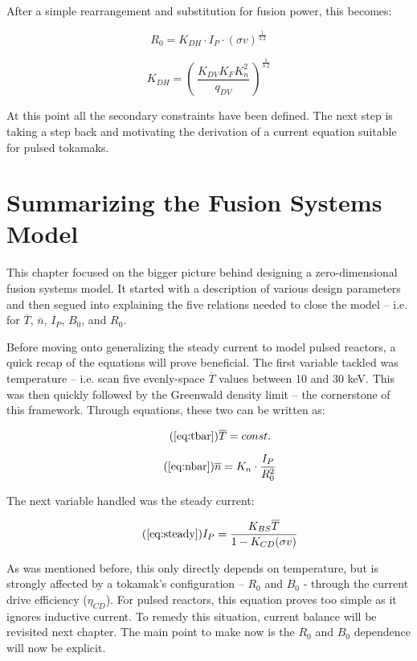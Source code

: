 \documentclass[11pt]{book}
\begin{document}
After a simple rearrangement and substitution for fusion power, this becomes:

\begin{equation}
	R_0 = K_{DH} \cdot I_P \cdot (\sigma v)^ {\frac{1}{3.2}} 
\end{equation}

\begin{equation}
	K_{DH} = \left( \, \frac{ K_{DV} K_F K_n^2 }{ q_{DV} } \, \right) ^ {\frac{1}{3.2}}
\end{equation}

At this point all the secondary constraints have been defined. The next step is taking a step back and motivating the derivation of a current equation suitable for pulsed tokamaks.

\section{Summarizing the Fusion Systems Model}

This chapter focused on the bigger picture behind designing a zero-dimensional fusion systems model. It started with a description of various design parameters and then segued into explaining the five relations needed to close the model -- i.e. for $\overline T$, $\overline n$, $I_P$, $B_0$, and $R_0$.

Before moving onto generalizing the steady current to model pulsed reactors, a quick recap of the equations will prove beneficial. The first variable tackled was temperature -- i.e. scan five evenly-space $\overline T$ values between 10 and 30 keV. This was then quickly followed by the Greenwald density limit -- the cornerstone of this framework. Through equations, these two can be written as:

\begin{equation}
	\tag{\ref{eq:tbar}}
	\overline T = const.
\end{equation}

\begin{equation}
	\tag{\ref{eq:nbar}}
	\overline n = K_n \cdot \frac{I_P}{R_0^2}
\end{equation}

The next variable handled was the steady current:

\begin{equation}
	\tag{\ref{eq:steady}}
	I_P = \frac{K_{BS} \overline T}{1 - K_{CD} ( \sigma v ) }
\end{equation}

As was mentioned before, this only directly depends on temperature, but is strongly affected by a tokamak's configuration -- $R_0$ and $B_0$ - through the current drive efficiency ($\eta_{CD}$). For pulsed reactors, this equation proves too simple as it ignores inductive current. To remedy this situation, current balance will be revisited next chapter. The main point to make now is the $R_0$ and $B_0$ dependence will now be explicit.
\end{document}

